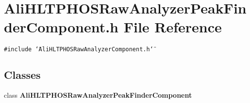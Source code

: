 \section{Ali\-HLTPHOSRaw\-Analyzer\-Peak\-Finder\-Component.h File Reference}
\label{AliHLTPHOSRawAnalyzerPeakFinderComponent_8h}
{\tt \#include \char`\"{}Ali\-HLTPHOSRaw\-Analyzer\-Component.h\char`\"{}}\par
\subsection*{Classes}
\begin{CompactItemize}
\item 
class {\bf Ali\-HLTPHOSRaw\-Analyzer\-Peak\-Finder\-Component}
\end{CompactItemize}
